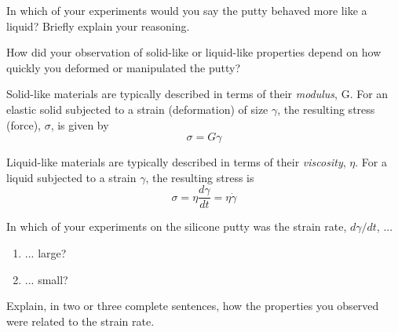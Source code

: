 \begin{activity}
\begin{ctqs}
	\question In which of your experiments would you say the putty behaved more like a liquid?  Briefly explain your reasoning.
	
		\begin{solution}[1in]
		\end{solution}
	
	\question How did your observation of solid-like or liquid-like properties depend on how quickly you deformed or manipulated the putty?
	
		\begin{solution}[1in]
		\end{solution}
		
\end{ctqs}

\begin{infobox}

	Solid-like materials are typically described in terms of their \emph{modulus}, G.  For an elastic solid subjected to a strain (deformation) of size $\gamma$, the resulting stress (force), $\sigma$, is given by
	\begin{equation*}
		\sigma = G\gamma
	\end{equation*}
	
	Liquid-like materials are typically described in terms of their \emph{viscosity}, $\eta$.  For a liquid subjected to a strain $\gamma$, the resulting stress is 
	\begin{equation*}
		\sigma = \eta \frac{d\gamma}{dt} = \eta \dot\gamma
	\end{equation*}

\end{infobox}

\begin{ctqs}
		
		\question In which of your experiments on the silicone putty was the strain rate, $d\gamma/dt$, ...
			\begin{enumerate}
				\item ... large?
	
					\begin{solution}[1in]
					\end{solution}
				
				\item ... small?
			
					\begin{solution}[1in]
					\end{solution}
			\end{enumerate}
		
		\question Explain, in two or three complete sentences, how the properties you observed were related to the strain rate.
	

\end{ctqs}
\end{activity}
